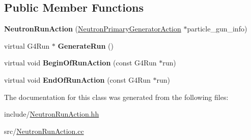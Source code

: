 \subsection*{Public Member Functions}
\begin{DoxyCompactItemize}
\item 
\mbox{\label{classNeutronRunAction_aedf76bb3ee1a8fb0bf0d626ec8939465}} 
{\bfseries Neutron\+Run\+Action} (\hyperlink{classNeutronPrimaryGeneratorAction}{Neutron\+Primary\+Generator\+Action} $\ast$particle\+\_\+gun\+\_\+info)
\item 
\mbox{\label{classNeutronRunAction_a9dce5b57c14691296f1705f57074d8af}} 
virtual G4\+Run $\ast$ {\bfseries Generate\+Run} ()
\item 
\mbox{\label{classNeutronRunAction_afe9e7f70040e7ca3bed78ac2234726d1}} 
virtual void {\bfseries Begin\+Of\+Run\+Action} (const G4\+Run $\ast$run)
\item 
\mbox{\label{classNeutronRunAction_afaa663339bbeaf39a71b5e3052be367e}} 
virtual void {\bfseries End\+Of\+Run\+Action} (const G4\+Run $\ast$run)
\end{DoxyCompactItemize}


The documentation for this class was generated from the following files\+:\begin{DoxyCompactItemize}
\item 
include/\hyperlink{NeutronRunAction_8hh}{Neutron\+Run\+Action.\+hh}\item 
src/\hyperlink{NeutronRunAction_8cc}{Neutron\+Run\+Action.\+cc}\end{DoxyCompactItemize}
